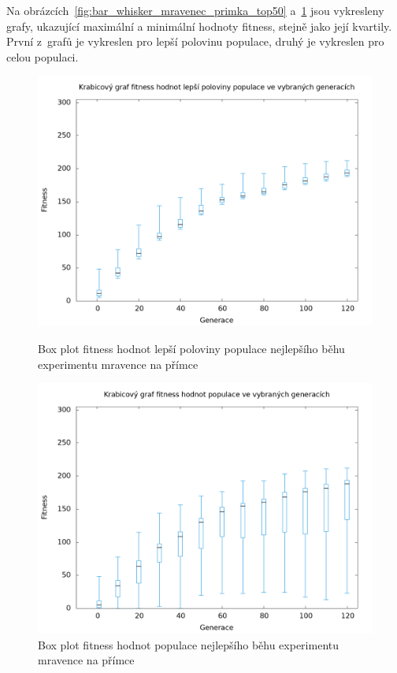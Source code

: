 Na obrázcích~\ref{fig:bar_whisker_mravenec_primka_top50} a~\ref{fig:bar_whisker_mravenec_primka} jsou vykresleny grafy, ukazující maximální a minimální hodnoty fitness, stejně jako její kvartily.
První z~grafů je vykreslen pro lepší polovinu populace, druhý je vykreslen pro celou populaci.

\begin{figure}[h]
    \begin{minipage}[c]{0.48\linewidth}
        \includegraphics[width=\linewidth]{obrazky/bar_whisker_mravenec_primka_top50.png}
        \caption{Box plot fitness hodnot lepší poloviny populace nejlepšího běhu experimentu mravence na přímce}
        \label{fig:bar_whisker_mravenec_primka_top50}
    \end{minipage}
    \hfill
    \begin{minipage}[c]{0.48\linewidth}
        \includegraphics[width=\linewidth]{obrazky/bar_whisker_mravenec_primka.png}
        \caption{Box plot fitness hodnot populace nejlepšího běhu experimentu mravence na přímce}
        \label{fig:bar_whisker_mravenec_primka}
    \end{minipage}
\end{figure}

